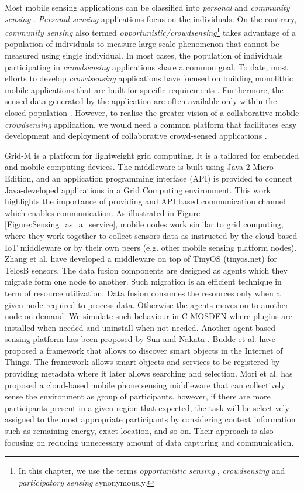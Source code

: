 \documentclass[journal]{IEEEtran}
\newcommand{\crowdsensing}{\textit{crowdsensing }}
\begin{document}
Most mobile sensing applications can be classified into \textit{personal} and \textit{community sensing} \cite{P217}. \textit{Personal sensing} applications focus on the individuals. On the contrary, \textit{community sensing} also termed \textit{opportunistic/crowdsensing}\footnote{In this chapter, we use the terms \textit{opportunistic sensing }, \textit{crowdsensing } and \textit{participatory sensing }synonymously.} takes advantage of a population of individuals to measure large-scale phenomenon that cannot be measured using single individual. In most cases, the population of individuals participating in \crowdsensing applications share a common goal. To date, most efforts to develop \crowdsensing applications have focused on building monolithic mobile applications that are built for specific requirements \cite{pogo}. Furthermore, the sensed data generated by the application are often available only within the closed population \cite{P485}. However, to realise the greater vision of a collaborative mobile \crowdsensing application, we would need a common platform that facilitates easy development and deployment of collaborative crowd-sensed applications \cite{Z1034}. 


Grid-M \cite{Z1019} is a platform for lightweight grid computing. It is a tailored for embedded and mobile computing devices. The middleware is built using  Java 2 Micro Edition, and an application programming interface (API) is provided to connect Java-developed applications in a Grid Computing environment. This work highlights the importance of providing and API based communication channel which enables communication. As illustrated in Figure \ref{Figure:Sensing_as_a_service}, mobile nodes work  similar to grid computing,  where they work together to collect sensors data as instructed by the cloud based IoT middleware or by their own peers (e.g. other mobile sensing platform nodes). Zhang et al. \cite{Z1021} have developed a middleware on top of TinyOS (tinyos.net)  for TelosB sensors. The data fusion components are designed as agents which they migrate form one node to another. Such migration is an efficient technique in term of resource utilization. Data fusion consumes the resources only when a given node required to process data. Otherwise the agents moves on to another node on demand. We simulate such behaviour in C-MOSDEN where plugins are installed when needed and uninstall when not needed. Another agent-based sensing platform has been proposed by Sun and Nakata \cite{Z1026}. Budde et al. \cite{Z1030} have proposed a framework that allows to discover  smart objects in the Internet of Things. The framework allows smart objects and services to be registered by providing metadata where it later allows searching and selection. Mori et al. \cite{Mori} has proposed a cloud-based mobile phone sensing middleware \cite{TCSS2} that can collectively sense the environment as group of participants. however, if there are more participants present in a given region that expected, the task will be selectively assigned to the most appropriate participants by considering context information such as remaining energy, exact location, and so on. Their approach is also focusing on reducing unnecessary amount of data capturing and communication.
\end{document}
